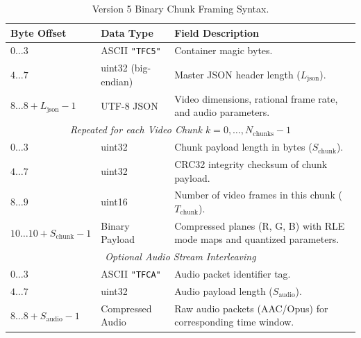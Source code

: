 \begin{table}[h]
\centering
\small
\caption{Version 5 Binary Chunk Framing Syntax.}
\label{tab:v5_syntax}
\begin{tabular}{llp{7cm}}
\toprule
\textbf{Byte Offset} & \textbf{Data Type} & \textbf{Field Description} \\
\midrule
$0 \dots 3$ & ASCII \texttt{"TFC5"} & Container magic bytes. \\
$4 \dots 7$ & uint32 (big-endian) & Master JSON header length ($L_{\text{json}}$). \\
$8 \dots 8 + L_{\text{json}} - 1$ & UTF-8 JSON & Video dimensions, rational frame rate, and audio parameters. \\
\midrule
\multicolumn{3}{c}{\textit{Repeated for each Video Chunk $k = 0, \dots, N_{\text{chunks}}-1$}} \\
\midrule
$0 \dots 3$ & uint32 & Chunk payload length in bytes ($S_{\text{chunk}}$). \\
$4 \dots 7$ & uint32 & CRC32 integrity checksum of chunk payload. \\
$8 \dots 9$ & uint16 & Number of video frames in this chunk ($T_{\text{chunk}}$). \\
$10 \dots 10 + S_{\text{chunk}} - 1$ & Binary Payload & Compressed planes (R, G, B) with RLE mode maps and quantized parameters. \\
\midrule
\multicolumn{3}{c}{\textit{Optional Audio Stream Interleaving}} \\
\midrule
$0 \dots 3$ & ASCII \texttt{"TFCA"} & Audio packet identifier tag. \\
$4 \dots 7$ & uint32 & Audio payload length ($S_{\text{audio}}$). \\
$8 \dots 8 + S_{\text{audio}} - 1$ & Compressed Audio & Raw audio packets (AAC/Opus) for corresponding time window. \\
\bottomrule
\end{tabular}
\end{table}

